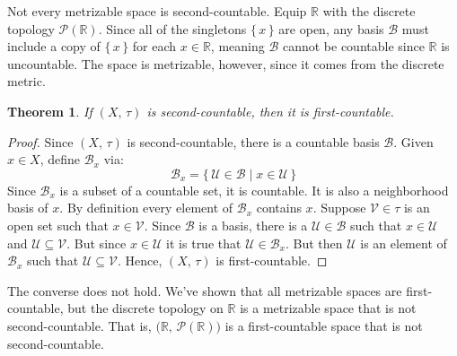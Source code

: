 \documentclass{article}
\theoremstyle{plain}
\newtheorem{theorem}{Theorem}[section]
\theoremstyle{normal}
\newenvironment{example}{%
    \pushQED{\qed}\renewcommand{\qedsymbol}{$\blacksquare$}\examplex%
}{%
    \popQED\endexamplex%
}
\begin{document}
        \begin{example}
            Not every metrizable space is second-countable. Equip
            $\mathbb{R}$ with the discrete topology $\mathcal{P}(\mathbb{R})$.
            Since all of the singletons $\{\,x\,\}$ are open, any basis
            $\mathcal{B}$ must include a copy of
            $\{\,x\,\}$ for each $x\in\mathbb{R}$, meaning $\mathcal{B}$ cannot
            be countable since $\mathbb{R}$ is uncountable. The space is
            metrizable, however, since it comes from the discrete metric.
        \end{example}
        \begin{theorem}
            If $(X,\,\tau)$ is second-countable, then it is first-countable.
        \end{theorem}
        \begin{proof}
            Since $(X,\,\tau)$ is second-countable, there is a countable
            basis $\mathcal{B}$. Given $x\in{X}$, define
            $\mathcal{B}_{x}$ via:
            \begin{equation}
                \mathcal{B}_{x}=\{\,\mathcal{U}\in\mathcal{B}\;|\;
                    x\in\mathcal{U}\,\}
            \end{equation}
            Since $\mathcal{B}_{x}$ is a subset of a countable set, it is
            countable. It is also a neighborhood basis of $x$. By definition
            every element of $\mathcal{B}_{x}$ contains $x$. Suppose
            $\mathcal{V}\in\tau$ is an open set such that
            $x\in\mathcal{V}$. Since $\mathcal{B}$ is a basis, there is a
            $\mathcal{U}\in\mathcal{B}$ such that
            $x\in\mathcal{U}$ and $\mathcal{U}\subseteq\mathcal{V}$. But since
            $x\in\mathcal{U}$ it is true that $\mathcal{U}\in\mathcal{B}_{x}$.
            But then $\mathcal{U}$ is an element of $\mathcal{B}_{x}$ such that
            $\mathcal{U}\subseteq\mathcal{V}$. Hence, $(X,\,\tau)$ is
            first-countable.
        \end{proof}
        The converse does not hold. We've shown that all metrizable spaces are
        first-countable, but the discrete topology on $\mathbb{R}$ is a
        metrizable space that is not second-countable. That is,
        $\big(\mathbb{R},\,\mathcal{P}(\mathbb{R})\big)$ is a first-countable
        space that is not second-countable.
\end{document}
